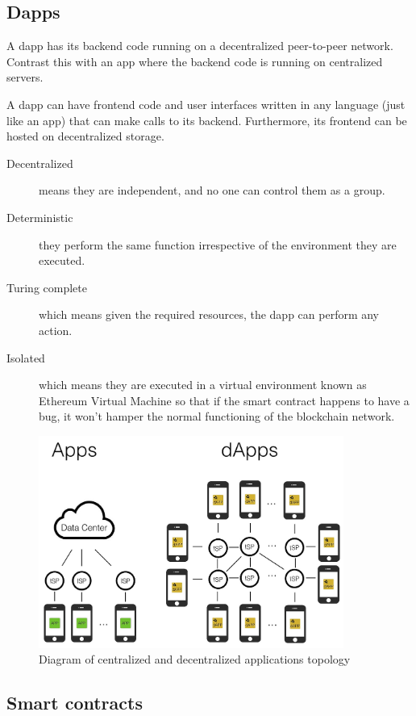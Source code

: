 \subsection{Dapps}

A dapp has its backend code running on a decentralized peer-to-peer network. Contrast this with an app where the backend code is running on centralized servers.

A dapp can have frontend code and user interfaces written in any language (just like an app) that can make calls to its backend. Furthermore, its frontend can be hosted on decentralized storage.\cite{ethereumcommunityEthereumDevelopmentDocumentation}

\begin{description}
\item[Decentralized] means they are independent, and no one can control them as a group.
\item[Deterministic] they perform the same function irrespective of the environment they are executed.
\item[Turing complete] which means given the required resources, the dapp can perform any action.
\item[Isolated] which means they are executed in a virtual environment known as Ethereum Virtual Machine so that if the smart contract happens to have a bug, it won’t hamper the normal functioning of the blockchain network.
\end{description}

\begin{figure}[H]
	\centering
		\includegraphics[width=10cm]{images/chapter2/dapps.png}
		\caption{{\footnotesize Diagram of centralized and decentralized applications topology}}
\end{figure}

\subsection{Smart contracts}

